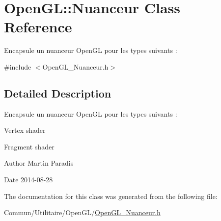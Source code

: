 \hypertarget{class_open_g_l_1_1_nuanceur}{}\section{Open\+GL\+:\+:Nuanceur Class Reference}
\label{class_open_g_l_1_1_nuanceur}


Encapsule un nuanceur Open\+GL pour les types suivants \+:  




{\ttfamily \#include $<$Open\+G\+L\+\_\+\+Nuanceur.\+h$>$}



\subsection{Detailed Description}
Encapsule un nuanceur Open\+GL pour les types suivants \+: 


\begin{DoxyItemize}
\item Vertex shader
\item Fragment shader
\end{DoxyItemize}

\begin{DoxyAuthor}{Author}
Martin Paradis 
\end{DoxyAuthor}
\begin{DoxyDate}{Date}
2014-\/08-\/28 
\end{DoxyDate}


The documentation for this class was generated from the following file\+:\begin{DoxyCompactItemize}
\item 
Commun/\+Utilitaire/\+Open\+G\+L/\hyperlink{_open_g_l___nuanceur_8h}{Open\+G\+L\+\_\+\+Nuanceur.\+h}\end{DoxyCompactItemize}
